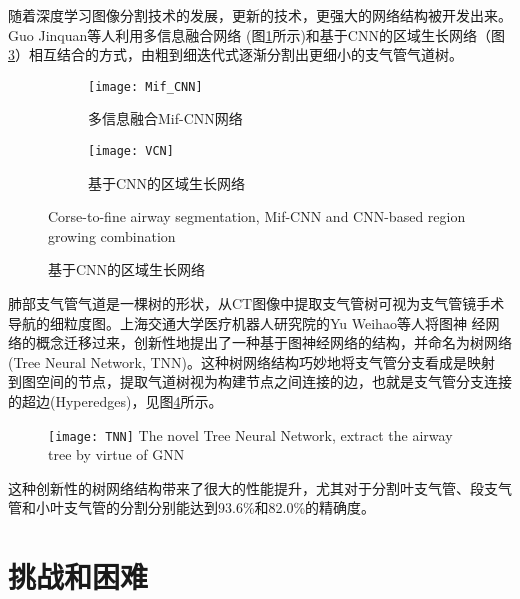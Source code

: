	 随着深度学习图像分割技术的发展，更新的技术，更强大的网络结构被开发出来。Guo Jinquan等人\cite{Guo2021CoarsetofineAS}利用多信息融合网络
	 (图\ref{fig:MifCNN}所示)和基于CNN的区域生长网络（图\ref{fig:VCN}）相互结合的方式，由粗到细迭代式逐渐分割出更细小的支气管气道树。
	 \begin{figure}[t]
	 	\centering
	 	
	 	\begin{subfigure}{\textwidth}
	 		\centering
	 		\texttt{[image: Mif\_CNN]}
	 		\caption{多信息融合Mif-CNN网络}
	 		\label{fig:MifCNN}
	 	\end{subfigure}
	 	
	 	\vspace{5mm}
	 	
	 	\begin{subfigure}{\textwidth}
	 		\centering
	 		\texttt{[image: VCN]}
	 		\caption{基于CNN的区域生长网络}
	 		\label{fig:VCN}
	 	\end{subfigure}
	 	
	 		{Corse-to-fine airway segmentation, Mif-CNN and CNN-based region growing combination}
	 \end{figure}
	 
	 肺部支气管气道是一棵树的形状，从CT图像中提取支气管树可视为支气管镜手术导航的细粒度图。上海交通大学医疗机器人研究院的Yu Weihao等人\cite{Yu2022TNN}将图神
	 经网络的概念迁移过来，创新性地提出了一种基于图神经网络的结构，并命名为树网络(Tree Neural Network, TNN)。这种树网络结构巧妙地将支气管分支看成是映射
	 到图空间的节点，提取气道树视为构建节点之间连接的边，也就是支气管分支连接的超边(Hyperedges)，见图\ref{fig:TNN}所示。
	 \begin{figure}[htpb]
	 	\centering
	 	\texttt{[image: TNN]}
	 		{The novel Tree Neural Network, extract the airway tree by virtue of GNN}
		\label{fig:TNN}
	 \end{figure}
	 
	 这种创新性的树网络结构带来了很大的性能提升，尤其对于分割叶支气管、段支气管和小叶支气管的分割分别能达到93.6\%和82.0\%\cite{Yu2022TNN}的精确度。



\section{挑战和困难}

